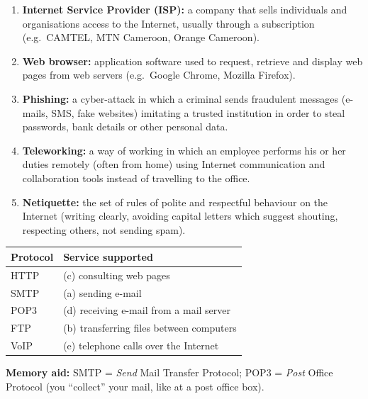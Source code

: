 \documentclass[11pt]{article}
\begin{document}
\begin{corrige}
\begin{enumerate}
\item \textbf{Internet Service Provider (ISP):} a company that sells individuals and organisations access to the Internet, usually through a subscription (e.g.\ CAMTEL, MTN Cameroon, Orange Cameroon).
\item \textbf{Web browser:} application software used to request, retrieve and display web pages from web servers (e.g.\ Google Chrome, Mozilla Firefox).
\item \textbf{Phishing:} a cyber-attack in which a criminal sends fraudulent messages (e-mails, SMS, fake websites) imitating a trusted institution in order to steal passwords, bank details or other personal data.
\item \textbf{Teleworking:} a way of working in which an employee performs his or her duties remotely (often from home) using Internet communication and collaboration tools instead of travelling to the office.
\item \textbf{Netiquette:} the set of rules of polite and respectful behaviour on the Internet (writing clearly, avoiding capital letters which suggest shouting, respecting others, not sending spam).
\end{enumerate}
\end{corrige}

\begin{corrige}
\begin{center}
\begin{tabularx}{\linewidth}{|l|X|}\hline
\rowcolor{popblueL} \textbf{Protocol} & \textbf{Service supported} \\ \hline
HTTP & (c) consulting web pages \\ \hline
SMTP & (a) sending e-mail \\ \hline
POP3 & (d) receiving e-mail from a mail server \\ \hline
FTP & (b) transferring files between computers \\ \hline
VoIP & (e) telephone calls over the Internet \\ \hline
\end{tabularx}
\end{center}
\textbf{Memory aid:} SMTP = \emph{Send} Mail Transfer Protocol; POP3 = \emph{Post} Office Protocol (you ``collect'' your mail, like at a post office box).
\end{corrige}
\end{document}
